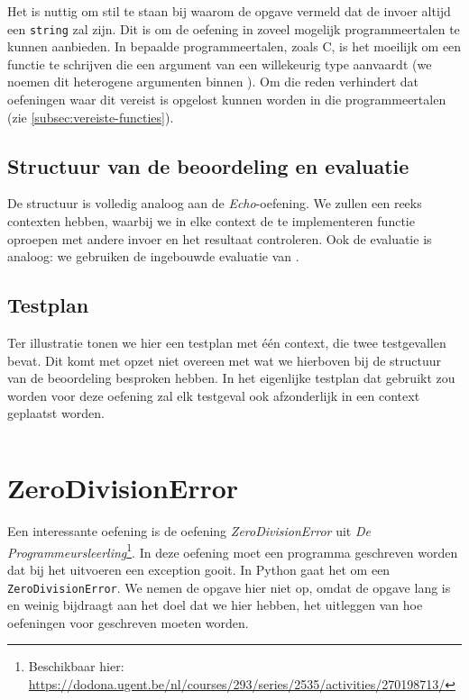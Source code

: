 Het is nuttig om stil te staan bij waarom de opgave vermeld dat de invoer altijd een \texttt{string} zal zijn.
Dit is om de oefening in zoveel mogelijk programmeertalen te kunnen aanbieden.
In bepaalde programmeertalen, zoals C, is het moeilijk om een functie te schrijven die een argument van een willekeurig type aanvaardt (we noemen dit heterogene argumenten binnen \tested{}).
Om die reden verhindert \tested{} dat oefeningen waar dit vereist is opgelost kunnen worden in die programmeertalen (zie \cref{subsec:vereiste-functies}).

\subsection{Structuur van de beoordeling en evaluatie}\label{subsec:oefening-echofunctie-structuur}

De structuur is volledig analoog aan de \emph{Echo}-oefening.
We zullen een reeks contexten hebben, waarbij we in elke context de te implementeren functie oproepen met andere invoer en het resultaat controleren.
Ook de evaluatie is analoog: we gebruiken de ingebouwde evaluatie van \tested{}.

\subsection{Testplan}\label{subsec:oefening-echofunctie-testplan}

Ter illustratie tonen we hier een testplan met één context, die twee testgevallen bevat.
Dit komt met opzet niet overeen met wat we hierboven bij de structuur van de beoordeling besproken hebben.
In het eigenlijke testplan dat gebruikt zou worden voor deze oefening zal elk testgeval ook afzonderlijk in een context geplaatst worden.

\inputminted{json}{sources/echo-function/one-testcase.tson}

\section{ZeroDivisionError}\label{sec:oefening-zero}

Een interessante oefening is de oefening \emph{ZeroDivisionError} uit \emph{De Programmeursleerling}\footnote{Beschikbaar hier: \url{https://dodona.ugent.be/nl/courses/293/series/2535/activities/270198713/}}.
In deze oefening moet een programma geschreven worden dat bij het uitvoeren een exception gooit.
In Python gaat het om een \texttt{ZeroDivisionError}.
We nemen de opgave hier niet op, omdat de opgave lang is en weinig bijdraagt aan het doel dat we hier hebben, het uitleggen van hoe oefeningen voor \tested{} geschreven moeten worden.

